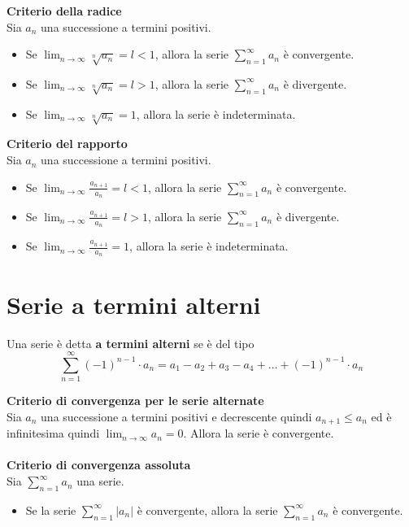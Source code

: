\documentclass{article}
\begin{document}
\textbf{Criterio della radice}\\
Sia $a_n$ una successione a termini positivi.
\begin{itemize}
    \item Se $\lim_{n \to \infty} \sqrt[n]{a_n} = l < 1$, allora la serie
          $\sum_{n=1}^\infty a_n$ è convergente.
    \item Se $\lim_{n \to \infty} \sqrt[n]{a_n} = l > 1$, allora la serie
          $\sum_{n=1}^\infty a_n$ è divergente.
    \item Se $\lim_{n \to \infty} \sqrt[n]{a_n} = 1$, allora la serie è indeterminata.
\end{itemize}
\newpage
\textbf{Criterio del rapporto}\\
Sia $a_n$ una successione a termini positivi.
\begin{itemize}
    \item Se $\lim_{n \to \infty} \frac{a_{n+1}}{a_n} = l < 1$, allora la serie
          $\sum_{n=1}^\infty a_n$ è convergente.
    \item Se $\lim_{n \to \infty} \frac{a_{n+1}}{a_n} = l > 1$, allora la serie
          $\sum_{n=1}^\infty a_n$ è divergente.
    \item Se $\lim_{n \to \infty} \frac{a_{n+1}}{a_n} = 1$, allora la serie è indeterminata.
\end{itemize}
\section*{Serie a termini alterni}
Una serie è detta \textbf{a termini alterni} se è del tipo
\begin{equation*}
    \sum_{n=1}^\infty (-1)^{n-1} \cdot a_n = a_1 - a_2 + a_3 - a_4 + \dots + (-1)^{n-1} \cdot a_n
\end{equation*}

\textbf{Criterio di convergenza per le serie alternate}\\
Sia $a_n$ una successione a termini positivi e decrescente quindi $a_{n+1}\leq a_n$ ed è infinitesima quindi $\lim_{n \to \infty} a_n = 0$. Allora la serie è convergente.\\\\
\textbf{Criterio di convergenza assoluta}\\
Sia $\sum_{n=1}^\infty a_n$ una serie.
\begin{itemize}
    \item Se la serie $\sum_{n=1}^\infty |a_n|$ è convergente, allora la serie
          $\sum_{n=1}^\infty a_n$ è convergente.
\end{itemize}
\end{document}
